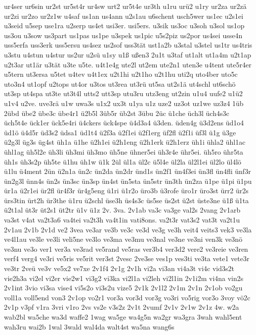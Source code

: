 {ur4ser
ur6sin
ur2st
ur5st4r
ur4sw
urt2
ur5t4e
ur3th
u1ru
urü2
u1ry
ur2za
ur2zä
ur2zi
ur2zo
ur2z1w
u4saf
us1an
us4ann
u2s1au
u6schent
usch5wer
us1ec
u2s1ei
u3seid
u5sep
use1ra
u2serp
us4et
usi3er.
usi5ers.
u3sik
us3oc
u3soh
u3sol
us1op
us3ou
u3sow
us3part
us1pas
us1pe
u3spek
us1pic
u5s2piz
us2por
us4sei
usse4n
uss5erfa
uss3erk
uss5ersu
us4sez
us2sof
uss3tät
ust1a2b
u3stal
u3stel
us1tr
us4tris
u3stu
u4stun
u4stur
us2ur
u2sü
u1sy
u1ß
ußen3
2u1t
u3taf
ut1alt
ut1a4m
u2t1ap
u2t3ar
ut1är
u3tät
u3te
u5te.
u4t1e4g
ute2l
ut2em
ute2n1
uten3e
u4tent
ute5r4er
u5tern
ut3ersa
u5tet
u4tev
u4t1ex
u2t1hi
u2t1ho
u2t1hu
uti2q
uto4ber
uto5c
uto3n4
ut1opf
u2tops
ut4or
u3tos
ut3rea
ut3rü
ut5sa
ut2s1ä
ut4schl
ut6schö
ut3sp
ut4spa
ut3te
ut3t4l
utts2
utt3sp
utu3ru
utz3eng
ut2zin
u1u4
uufe2
u1ü2
u1v4
u2ve.
uve3rä
u1w
uwa3s
u1x2
ux3t
u1ya
u1z
uze2
uz3ot
uz1we
uz3z4
1üb
2übd
übe2
übe3c
übe4r1
ü2b5l
3üb5r
üb2st
3übu
2üc
ü1che
üch3l
üch4s3c
üch5t4e
ück1er
ück5e4ri
ü4ckers
ück4spe
ü4d3a4
ü3den.
üden4g
ü3d2ens
üd1o4
üd1ö
ü4d5r
üd3s2
üdsa1
üd1t4
ü2f3a
ü2f1ei
ü2f1erg
üf2fl
ü2f1i
üf3l
ü1g
ü3ge
ü2g3l
üg3s
üg4st
üh1a
ü1he
ü2h1ei
ü2h1eng
ü2h1erk
ü2h1erz
üh1i
ühla2
ühl1ac
ühl1ag
üh5l2e
üh3li
üh3mi
üh3mo
üh5ne
ühner5ei
üh3r4e
ühr5ei.
üh5ro
ühr5ta
üh1s
üh3s2p
üh5te
ü1hu
üh1w
ü1k
2ül
ül1a
ül2c
ü5l4e
ül2la
ül2l1ei
ül2lo
ül4lö
ü1lu
ü4ment
2ün
ü2n1a
ün2c
ün2da
ün2dr
ünd1s
ün2f1
ün4f3ei
ün3fl
ün4fli
ünf3r
ün2g3l
ünn4s
ün2s
ün3sc
ün3sp
ün4st
ün5sta
ün5str
ün3th
ün2za
ü1pe
ü1pi
ü1pu
ür1a
ü2r1ei
ür2fl
ür4f3r
ür4g5eng
ü1ri
ü1r2o
üro3b
ü3rofe
üro1r
üro3st
ürr2
ür2s
ürs3tin
ürt2h
ür3the
ü1ru
ü2schl
üse3h
üs4s3c
üs5se
üs2st
ü2st
üste3ne
ü1ß
ü1ta
ü2t1al
üt3r
üt2s1
üt2tr
ü1v
ü1z
2v.
3va.
2v1ab
va3c
va3ge
val2s
2vang
2v1arb
va3st
v4at
va2t3a6
va4tei
va2t3h
va4t1in
vati8ons.
va2t3r
vat3s2
vat3t
va2t1u
2v1au
2v1b
2v1d
ve2
3vea
ve3ar
ve3b
ve3c
ve3d
ve3g
ve3h
veit4
veits3
vek3
ve3la
ve4l1au
ve3le
ve3li
veli5ne
ve3lo
ve3ma
ve3mu
ve3nal
ve3ne
ve3ni
ven3k
ve3nö
ve3nu
ve3o
ver1
ver3a
ve3rad
ve5rand
ve5ras
ver3b4
ver3d2
vere2
ve3reie
ve3ren
verf4
verg4
ve3ri
ve5ris
ve5rit
ver3st
2vesc
2ve3se
ves1p
ves3ti
ve3ta
vete1
vete3r
ve3tr
2veü
ve3v
ve5x2
ve7xe
2v1f4
2v1g
2v1h
vi2a
vi3an
vi4a3t
vi4c
vid3s2t
vie2h3a
vi2el
vi2er
vie2w1
vi3g2
vi3ka
vi2l1a
vi2leh
vi2l1in
2v1i2m
vi4na
vin2s
2v1int
3vio
vi3sa
vise4
vi5s2o
vi3s2u
vize5
2v1k
2v1l2
2v1m
2v1n
2v1ob
vo2gu
voll1a
voll5end
von3
2v1op
vo2r1
vor3a
vor3d
vor3g
vo3ri
vo5rig
vor3o
3voy
vö2c
2v1p
v3pf
v1ra
3vri
v1ro
2vs
vs2e
v3s2z
2v1t
2vumf
2v1v
2v1w
2v1z
4w.
w2a
wab2bl
wa5che
wa3d
waffe2
1wag
wa5ge
wa4g5n
wa2gr
wa3gra
3wah
wahl5ent
wah3ru
wai2b
1wal
3wald
wal4da
walt4st
wa5na
wang6s
}
